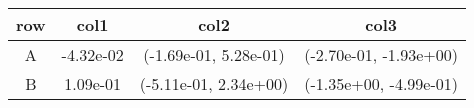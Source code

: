 \begin{tabular}{cccc}
\toprule
row&col1&col2&col3\tabularnewline
\midrule
A&-4.32e-02& (-1.69e-01, 5.28e-01)& (-2.70e-01, -1.93e+00)\tabularnewline
B&1.09e-01& (-5.11e-01, 2.34e+00)& (-1.35e+00, -4.99e-01)\tabularnewline
\bottomrule
\end{tabular}
